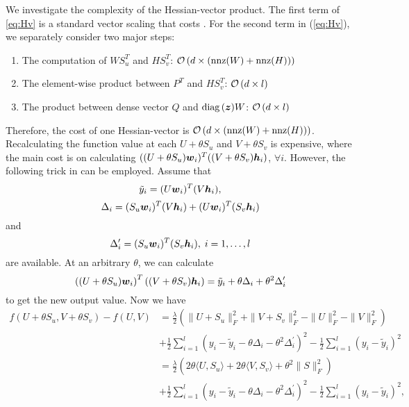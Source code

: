 We investigate the complexity of the Hessian-vector product. The first term of 
\eqref{eq:Hv} is a standard vector scaling that costs .
For the second term in (\ref{eq:Hv}), we separately consider two major steps:
\begin{enumerate}
    \item The computation of $WS_u^T$ and $HS_v^T$: $\mathcal{O}\left(d \times (\text{nnz}(W)+\text{nnz}(H))\right)$
    \item The element-wise product between $P^T$ and $HS_v^T$:  $\mathcal{O}\left( d \times l\right)$
    \item The product between dense vector $Q$ and $\operatorname*{diag}{(\boldsymbol{z})}W$: $\mathcal{O}\left(d \times l\right)$
\end{enumerate}
Therefore, the cost of one Hessian-vector  is $\mathcal{O}\left(d \times (\text{nnz}(W)+\text{nnz}(H)\right))$. 
\label{sec:implementLS}
Recalculating the function value at each $U+\theta S_{u}$ and $V+\theta S_{v}$ is expensive, where the main cost is on calculating $((U+\theta S_{u})\boldsymbol{w}_i)^T((V+\theta S_{v})\boldsymbol{h}_i)$, $\forall i$.
However, the following trick in \citet{GXY09a} can be employed.
Assume that
\begin{equation}
    \tilde{y}_i = (U\boldsymbol{w}_i)^T(V\boldsymbol{h}_i) 
    \label{eq:predicted_y},
\end{equation}
\begin{equation}
    {\Delta}_i=(S_u\boldsymbol{w}_i)^T(V\boldsymbol{h}_i)+(U\boldsymbol{w}_i)^T(S_v\boldsymbol{h}_i)   
    \label{eq:LsRequire_1}
\end{equation}
and
\begin{equation}
    {\Delta}_i^\prime = (S_u\boldsymbol{w}_i)^T(S_v\boldsymbol{h}_i),\; i=1,\dots,l    
    \label{eq:LsRequire_2}
\end{equation}
are available.
At an arbitrary $\theta$, we can calculate
\begin{equation}
    \left((U+\theta S_u)\boldsymbol{w}_i\right)^T\left((V+\theta S_v)\boldsymbol{h}_i\right) = \tilde{y}_i + \theta{\Delta}_i + {\theta}^2{\Delta}_i^\prime    
    \label{eq:ExpTheta}
\end{equation}
to get the new output value.
Now we have 
\begin{align}
        f(U+\theta S_{u},V+\theta S_{v}) - f(U,V) 
        &= \frac{\lambda}{2}\left(\|U+S_u\|_F^2+\|V+S_v\|_F^2-\|U\|_F^2-\|V\|_F^2\right)\nonumber\\
        &+ \frac{1}{2} \sum_{i=1}^l (y_i-\tilde{y}_i-\theta{\Delta}_i-{\theta}^2{\Delta}_i^\prime)^2 - \frac{1}{2} \sum_{i=1}^l (y_i-\tilde{y}_i)^2\nonumber\\
        &= \frac{\lambda}{2}\left( 2\theta \langle{U}{,}{S_u}\rangle + 2\theta \langle{V}{,}{S_v}\rangle + \theta^2\|S\|_F^2 \right)\nonumber\\ 
        &+ \frac{1}{2} \sum_{i=1}^l (y_i-\tilde{y}_i-\theta{\Delta}_i-{\theta}^2{\Delta}_i^\prime)^2 - \frac{1}{2} \sum_{i=1}^l (y_i-\tilde{y}_i)^2 \nonumber       
,
\end{align}
